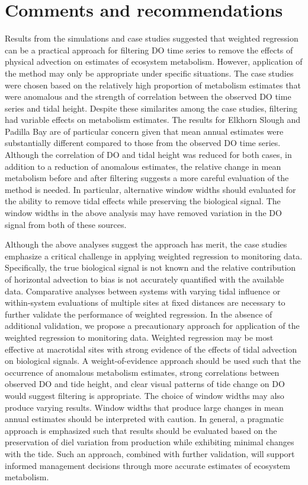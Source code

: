 \documentclass[letterpaper,12pt,oneside]{article}\usepackage[]{graphicx}\usepackage[]{color}
\begin{document}
\section{Comments and recommendations}

Results from the simulations and case studies suggested that weighted regression can be a practical approach for filtering \ac{DO} time series to remove the effects of physical advection on estimates of ecosystem metabolism.  However, application of the method may only be appropriate under specific situations.  The case studies were chosen based on the relatively high proportion of metabolism estimates that were anomalous and the strength of correlation between the observed \ac{DO} time series and tidal height.  Despite these similarites among the case studies, filtering had variable effects on metabolism estimates.  The results for Elkhorn Slough and Padilla Bay are of particular concern given that mean annual estimates were substantially different compared to those from the observed \ac{DO} time series.  Although the correlation of \ac{DO} and tidal height was reduced for both cases, in addition to a reduction of anomalous estimates, the relative change in mean metabolism before and after filtering suggests a more careful evaluation of the method is needed.  In particular, alternative window widths should evaluated for the ability to remove tidal effects while preserving the biological signal.  The window widths in the above analysis may have removed variation in the \ac{DO} signal from both of these sources.    

Although the above analyses suggest the approach has merit, the case studies emphasize a critical challenge in applying weighted regression to monitoring data. Specifically, the true biological signal is not known and the relative contribution of horizontal advection to bias is not accurately quantified with the available data.  Comparative analyses between systems with varying tidal influence or within-system evaluations of multiple sites at fixed distances are necessary to further validate the performance of weighted regression.  In the absence of additional validation, we propose a precautionary approach for application of the weighted regression to monitoring data.  Weighted regression may be most effective at macrotidal sites with strong evidence of the effects of tidal advection on biological signals.  A weight-of-evidence approach should be used such that the occurrence of anomalous metabolism estimates, strong correlations between observed \ac{DO} and tide height, and clear visual patterns of tide change on \ac{DO} would suggest filtering is appropriate.  The choice of window widths may also produce varying results.  Window widths that produce large changes in mean annual estimates should be interpreted with caution.  In general, a pragmatic approach is emphasized such that results should be evaluated based on the preservation of diel variation from production while exhibiting minimal changes with the tide.  Such an approach, combined with further validation, will support informed management decisions through more accurate estimates of ecosystem metabolism.  
\end{document}
